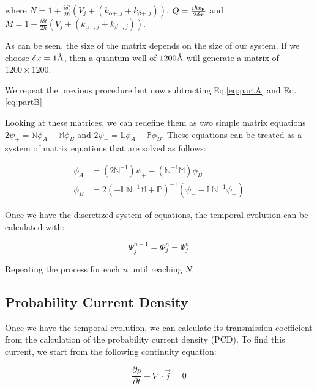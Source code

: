 \noindent where $N =1 + \frac{i\delta t}{2\hbar} \left( V_j + \left(k_{\alpha+,j}+k_{\beta+,j}\right)\right)$, $Q=\frac{i\hbar v_{\mbox{\tiny F}}}{2\delta x}$ and $M =1 + \frac{i\delta t}{2\hbar}\left( V_j + \left(k_{\alpha-,j}+k_{\beta-,j}\right)\right)$.

As can be seen, the size of the matrix depends on the size of our system.
If we choose $\delta x = 1\textup{\AA}$, then a quantum well of $1200\textup{\AA}$ will generate a matrix of $1200\times1200$.

We repeat the previous procedure but now subtracting Eq.\eqref{eq:partA} and Eq.\eqref{eq:partB}

Looking at these matrices, we can redefine them as two simple matrix equations $2\psi_+=\mathbb{N}\phi_A+\mathbb{M}\phi_B$ and $2\psi_-=\mathbb{L}\phi_A+\mathbb{P}\phi_B$.
These equations can be treated as a system of matrix equations that are solved as follows:

\begin{align}
    \label{eq:sistemaMatricial}
    \phi_A&=(2\mathbb{N}^{-1})\psi_+-(\mathbb{N}^{-1}\mathbb{M})\phi_B\nonumber\\
    \phi_B&=2(-\mathbb{L}\mathbb{N}^{-1}\mathbb{M}+\mathbb{P})^{-1}(\psi_--\mathbb{L}\mathbb{N}^{-1}\psi_+)
\end{align}

Once we have the discretized system of equations, the temporal evolution can be calculated with:

\begin{equation}
    \label{eq:siguienteTiempo}
    \Psi_j^{n+1}=\Phi_j^n-\Psi_j^n
\end{equation}

Repeating the process for each $n$ until reaching $N$.

\subsection{Probability Current Density}\label{subsec:probability-current-density}

Once we have the temporal evolution, we can calculate its transmission coefficient from the calculation of the probability current density (PCD).
To find this current, we start from the following continuity equation:

\begin{equation}
    \label{eq:continuidad}
    \frac{\partial\rho}{\partial t} + \nabla\cdot\vec{j}=0
\end{equation}

